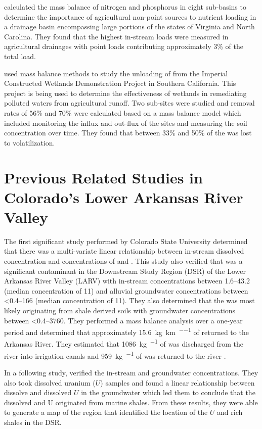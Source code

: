 \textcite{mcmahon1997} calculated the mass balance of nitrogen and phosphorus in eight sub-basins to determine the importance of agricultural non-point sources to nutrient loading in a drainage basin encompassing large portions of the states of Virginia and North Carolina.  They found that the highest in-stream loads were measured in agricultural drainages with point loads contributing approximately 3\% of the total load. 

\textcite{Gersberg2006} used mass balance methods to study the unloading of \Se from the Imperial Constructed Wetlands Demonstration Project in Southern California.  This project is being used to determine the effectiveness of wetlands in remediating \Se polluted waters from agricultural runoff.  Two sub-sites were studied and removal rates of 56\% and 70\% were calculated based on a mass balance model which included monitoring the influx and out-flux of the sites and measuring the soil concentration over time.  They found that between 33\% and 50\% of the \Se was lost to volatilization. 


\section{Previous Related Studies in Colorado's Lower Arkansas River Valley}
\label{sec:previous studies}

The first significant \Se study performed by Colorado State University determined that there was a multi-variate linear relationship between in-stream dissolved \Se concentration and concentrations of \sulfate and \nitrate.  This study also verified that \Se was a significant contaminant in the Downstream Study Region (DSR) of the Lower Arkansas River Valley (LARV) with in-stream concentrations between \SIrange{1.6}{43.2}{\mgl} (median concentration of \SI{11}{\mgl}) and alluvial groundwater concentrations between \SIrange{<0.4}{166}{\mgl} (median concentration of \SI{11}{\mgl}).  They also determined that the \Se was most likely originating from shale derived soils with groundwater concentrations between \SIrange{<0.4}{3760}{\mgl}.  They performed a mass balance analysis over a one-year period and determined that approximately \SI{15.6}{\kilo\g\per\kilo\m\per\year} of \Se returned to the Arkansas River.  They estimated that \SI{1086}{\kilo\g\per\year} of \Se was discharged from the river into irrigation canals and \SI{959}{\kilo\g\per\year} of \Se was returned to the river \parencite{donnelly2005}.

In a following study, \textcite{herting2006} verified the in-stream and groundwater \Se concentrations.  They also took dissolved uranium ($ U $) samples and found a linear relationship between dissolve \Se and dissolved $ U $ in the groundwater which led them to conclude that the dissolved \Se and U originated from marine shales.  From these results, they were able to generate a map of the region that identified the location of the $ U $ and \Se rich shales in the DSR.

